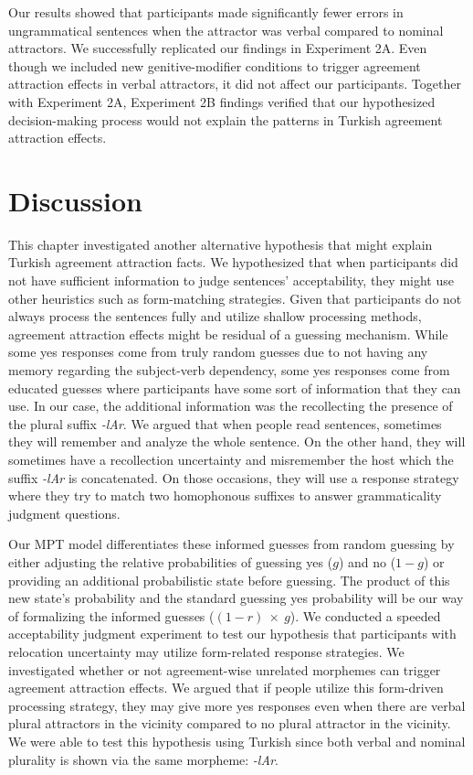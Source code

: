 Our results showed that participants made significantly fewer errors in ungrammatical sentences when the attractor was verbal compared to nominal attractors. We successfully replicated our findings in Experiment 2A. Even though we included new genitive-modifier conditions to trigger agreement attraction effects in verbal attractors, it did not affect our participants. Together with Experiment 2A, Experiment 2B findings verified that our hypothesized decision-making process would not explain the patterns in Turkish agreement attraction effects.  


\section{Discussion}

This chapter investigated another alternative hypothesis that might explain Turkish agreement attraction facts. We hypothesized that when participants did not have sufficient information to judge sentences' acceptability, they might use other heuristics such as form-matching strategies. Given that participants do not always process the sentences fully and utilize shallow processing methods, agreement attraction effects might be residual of a guessing mechanism. While some yes responses come from truly random guesses due to not having any memory regarding the subject-verb dependency, some yes responses come from educated guesses where participants have some sort of information that they can use. In our case, the additional information was the recollecting the presence of the plural suffix \emph{-lAr}. We argued that when people read sentences, sometimes they will remember and analyze the whole sentence. On the other hand, they will sometimes have a recollection uncertainty and misremember the host which the suffix \emph{-lAr} is concatenated. On those occasions, they will use a response strategy where they try to match two homophonous suffixes to answer grammaticality judgment questions.

Our MPT model differentiates these informed guesses from random guessing by either adjusting the relative probabilities of guessing yes ($g$) and no ($1-g$) or providing an additional probabilistic state before guessing. The product of this new state's probability and the standard guessing yes probability will be our way of formalizing the informed guesses ($(1-r){\ }\times{\ }g$). We conducted a speeded acceptability judgment experiment to test our hypothesis that participants with relocation uncertainty may utilize form-related response strategies. We investigated whether or not agreement-wise unrelated morphemes can trigger agreement attraction effects. We argued that if people utilize this form-driven processing strategy, they may give more yes responses even when there are verbal plural attractors in the vicinity compared to no plural attractor in the vicinity. We were able to test this hypothesis using Turkish since both verbal and nominal plurality is shown via the same morpheme: \emph{-lAr}.

